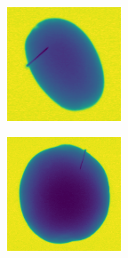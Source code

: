 \documentclass[11pt]{article}
\begin{document}
\begin{figure}[!h]
\begin{subfigure}[b]{0.22\textwidth}
         \caption{}
         \label{fig:metal_7}
     \end{subfigure}
     \\
    \begin{subfigure}[b]{0.22\textwidth}
         \centering
         \includegraphics[width=\textwidth]{figurer/potato_dataset/metal/metal_8.jpg}
         \caption{}
         \label{fig:metal_8}
     \end{subfigure}
     \hfill
     \begin{subfigure}[b]{0.22\textwidth}
         \centering
         \includegraphics[width=\textwidth]{figurer/potato_dataset/metal/metal_9.jpg}

\end{subfigure}
\end{figure}
\end{document}
